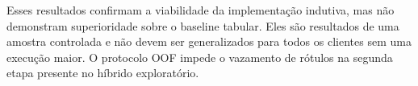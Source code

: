 \documentclass[conference]{IEEEtran}
\begin{document}
Esses resultados confirmam a viabilidade da implementação indutiva, mas não
demonstram superioridade sobre o baseline tabular. Eles são resultados de uma
amostra controlada e não devem ser generalizados para todos os clientes sem
uma execução maior. O protocolo OOF impede o vazamento de rótulos na segunda
etapa presente no híbrido exploratório.



\end{document}
